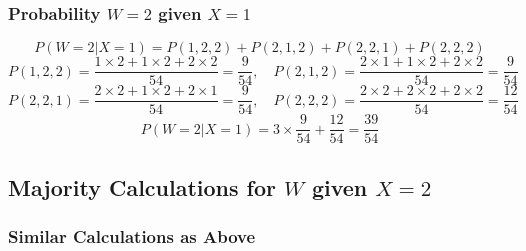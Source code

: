 \documentclass[12pt]{article}
\begin{document}
\subsubsection*{Probability \( W = 2 \) given \( X = 1 \)}
\[
P(W = 2 | X = 1) = P(1, 2, 2) + P(2, 1, 2) + P(2, 2, 1) + P(2, 2, 2)
\]
\[
P(1, 2, 2) = \frac{1 \times 2 + 1 \times 2 + 2 \times 2}{54} = \frac{9}{54}, \quad
P(2, 1, 2) = \frac{2 \times 1 + 1 \times 2 + 2 \times 2}{54} = \frac{9}{54}
\]
\[
P(2, 2, 1) = \frac{2 \times 2 + 1 \times 2 + 2 \times 1}{54} = \frac{9}{54}, \quad
P(2, 2, 2) = \frac{2 \times 2 + 2 \times 2 + 2 \times 2}{54} = \frac{12}{54}
\]
\[
P(W = 2 | X = 1) = 3 \times \frac{9}{54} + \frac{12}{54} = \frac{39}{54}
\]

\subsection*{Majority Calculations for \( W \) given \( X = 2 \)}
\subsubsection*{Similar Calculations as Above}
\end{document}

